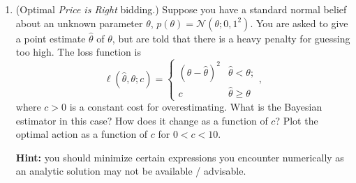 \documentclass{article}
\newcommand{\mc}[1]{\mathcal{#1}}
\begin{document}
\begin{enumerate}
  (a) A uniform prior on $\theta$, which can be realized by selecting
  the beta distribution with $\alpha = \beta = 1$:
  \[
    p(\theta) = \mathcal{B}(\theta; \alpha = 1, \beta = 1).
  \]

  (b) A prior with extreme bias toward small values of $\theta$:
  \[
    p(\theta) = \mathcal{B}(\theta; \alpha = 1, \beta = 100).
  \]

  (c) A prior that has no support on values greater than $\theta =
  \nicefrac{1}{2}$:
  \[
    p(\theta) = \begin{cases} 2 & \theta <    \nicefrac{1}{2}; \\
                              0 & \theta \geq \nicefrac{1}{2}. \end{cases}
  \]

\item
  (Optimal \emph{Price is Right} bidding.)
  Suppose you have a standard normal belief about an unknown parameter
  $\theta$, $p(\theta) = \mc{N}(\theta; 0, 1^2)$.  You are asked to
  give a point estimate $\hat{\theta}$ of $\theta$, but are told that
  there is a heavy penalty for guessing too high.  The loss function is
  \begin{equation*}
    \ell(\hat{\theta}, \theta; c)
    =
    \begin{cases}
      (\theta - \hat{\theta})^2 & \hat{\theta}  <   \theta; \\
      c                         & \hat{\theta} \geq \theta
    \end{cases},
  \end{equation*}
  where $c > 0$ is a constant cost for overestimating.  What is the
  Bayesian estimator in this case?  How does it change as a function
  of $c$? Plot the optimal action as a function of $c$ for $0 < c <
  10$.

  \textbf{Hint:} you should minimize certain expressions you
  encounter numerically as an analytic solution may not be available / advisable.

\end{enumerate}
\end{document}
